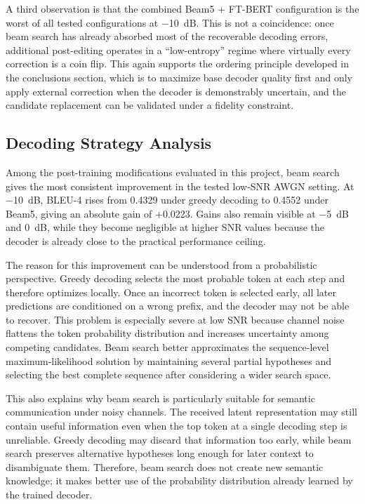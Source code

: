 A third observation is that the combined Beam5 + FT-BERT configuration is the worst of all tested configurations at \SI{-10}{dB}. This is not a coincidence: once beam search has already absorbed most of the recoverable decoding errors, additional post-editing operates in a “low-entropy” regime where virtually every correction is a coin flip. This again supports the ordering principle developed in the conclusions section, which is to maximize base decoder quality first and only apply external correction when the decoder is demonstrably uncertain, and the candidate replacement can be validated under a fidelity constraint.

\subsection{Decoding Strategy Analysis}

Among the post-training modifications evaluated in this project, beam search gives the most consistent improvement in the tested low-SNR AWGN setting. At \SI{-10}{dB}, BLEU-4 rises from 0.4329 under greedy decoding to 0.4552 under Beam5, giving an absolute gain of +0.0223. Gains also remain visible at \SI{-5}{dB} and \SI{0}{dB}, while they become negligible at higher SNR values because the decoder is already close to the practical performance ceiling.

The reason for this improvement can be understood from a probabilistic perspective. Greedy decoding selects the most probable token at each step and therefore optimizes locally. Once an incorrect token is selected early, all later predictions are conditioned on a wrong prefix, and the decoder may not be able to recover. This problem is especially severe at low SNR because channel noise flattens the token probability distribution and increases uncertainty among competing candidates. Beam search better approximates the sequence-level maximum-likelihood solution by maintaining several partial hypotheses and selecting the best complete sequence after considering a wider search space.

This also explains why beam search is particularly suitable for semantic communication under noisy channels. The received latent representation may still contain useful information even when the top token at a single decoding step is unreliable. Greedy decoding may discard that information too early, while beam search preserves alternative hypotheses long enough for later context to disambiguate them. Therefore, beam search does not create new semantic knowledge; it makes better use of the probability distribution already learned by the trained decoder.

